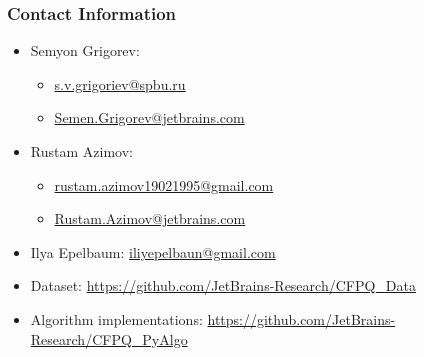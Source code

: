 \documentclass[xcolor=table]{beamer}
\begin{document}
\begin{frame}
\frametitle{Contact Information}
\begin{itemize}
  \item Semyon Grigorev:
    \begin{itemize}
      \item \href{mailto:s.v.grigoriev@spbu.ru}{s.v.grigoriev@spbu.ru}
      \item \href{mailto:Semen.Grigorev@jetbrains.com}{Semen.Grigorev@jetbrains.com}
    \end{itemize}
  \item Rustam Azimov:
  \begin{itemize}
  	\item \href{mailto:rustam.azimov19021995@gmail.com}{rustam.azimov19021995@gmail.com}
  	\item \href{mailto:Rustam.Azimov@jetbrains.com}{Rustam.Azimov@jetbrains.com}
  \end{itemize}
  \item Ilya Epelbaum: \href{mailto:iliyepelbaun@gmail.com}{iliyepelbaun@gmail.com}
\vspace{0.5cm}
  \item Dataset: \href{https://github.com/JetBrains-Research/CFPQ_Data}{https://github.com/JetBrains-Research/CFPQ\_Data}
   \item Algorithm implementations: \href{https://github.com/JetBrains-Research/CFPQ_PyAlgo}{https://github.com/JetBrains-Research/CFPQ\_PyAlgo}
\end{itemize}
\vspace{0.1cm}
\end{frame}
\end{document}
